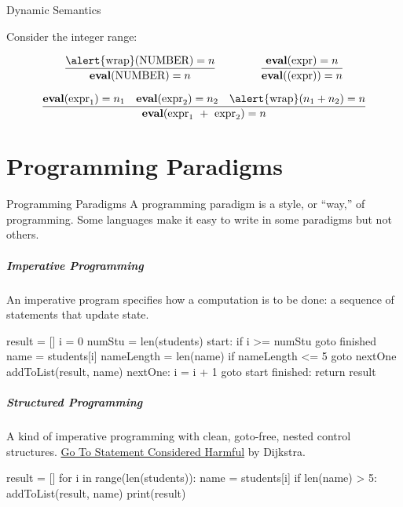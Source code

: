 \documentclass{plt}
\begin{document}
\begin{frame}{Dynamic Semantics}

Consider the integer range:

$$
\frac{\text{\alert{wrap}(NUMBER)} = n}{\textbf{eval}\text{(NUMBER)} = n} \qquad\qquad
\frac{\textbf{eval}\text{(expr)} = n}{\textbf{eval}\text{((expr))} = n}
$$

$$
\frac{\textbf{eval}(\text{expr}_1) = n_1 \quad \textbf{eval}(\text{expr}_2) = n_2
\quad \text{\alert{wrap}}(n_1 + n _2) = n}
{\textbf{eval}(\text{expr}_1\ +\ \text{expr}_2) = n}
$$

\end{frame}

\part{Programming Paradigms}

\begin{frame}{Programming Paradigms}
A programming paradigm is a \alert{style}, or ``way,'' of programming. 
Some languages make it easy to write in some paradigms but not others.
\end{frame}


\begin{frame}[fragile]
  \frametitle{Imperative Programming}
An imperative program specifies \alert{how} a computation is to be done: 
a sequence of statements that update state.


\begin{assembly}
    result = []
    i = 0
    numStu = len(students)
start:
    if i >= numStu goto finished
    name = students[i]
    nameLength = len(name)
    if nameLength <= 5 goto nextOne
    addToList(result, name)
nextOne:
    i = i + 1
    goto start
finished:
    return result
\end{assembly}
\end{frame}


\begin{frame}[fragile]
  \frametitle{Structured Programming}
A kind of imperative programming with clean, \alert{goto-free}, nested control structures.
\href{https://homepages.cwi.nl/~storm/teaching/reader/Dijkstra68.pdf}
{\alert{Go To Statement Considered Harmful}} by Dijkstra.

\vspace{10pt}

\begin{python}
result = []
for i in range(len(students)):
    name = students[i]
    if len(name) > 5:
        addToList(result, name)
print(result)
\end{python}
\end{frame}
\end{document}
